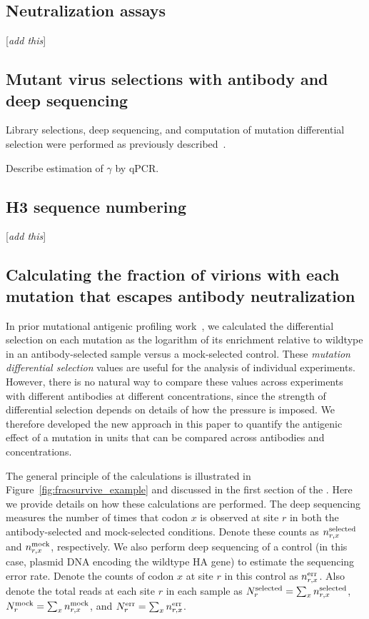 \documentclass[11pt]{article}
\newcommand{\comment}[1]{{\color{red}[\textsl{#1}]}}
\begin{document}
\subsection*{Neutralization assays}
\comment{add this}

\subsection*{Mutant virus selections with antibody and deep sequencing}
Library selections, deep sequencing, and computation of mutation differential selection were performed as previously described~\cite{doud2017complete}. 

Describe estimation of $\gamma$ by qPCR.

\subsection*{H3 sequence numbering}
\comment{add this}

\subsection*{Calculating the fraction of virions with each mutation that escapes antibody neutralization}
In prior mutational antigenic profiling work~\citep{doud2017complete,dingens2017comprehensive}, we calculated the differential selection on each mutation as the logarithm of its enrichment relative to wildtype in an antibody-selected sample versus a mock-selected control.
These \emph{mutation differential selection} values are useful for the analysis of individual experiments.
However, there is no natural way to compare these values across experiments with different antibodies at different concentrations, since the strength of differential selection depends on details of how the pressure is imposed.
We therefore developed the new approach in this paper to quantify the antigenic effect of a mutation in units that can be compared across antibodies and concentrations.

The general principle of the calculations is illustrated in Figure~\ref{fig:fracsurvive_example} and discussed in the first section of the .
Here we provide details on how these calculations are performed.
The deep sequencing measures the number of times that codon $x$ is observed at site $r$ in both the antibody-selected and mock-selected conditions. 
Denote these counts as $n_{r,x}^{\rm{selected}}$ and $n_{r,x}^{\rm{mock}}$, respectively.
We also perform deep sequencing of a control (in this case, plasmid DNA encoding the wildtype HA gene) to estimate the sequencing error rate.
Denote the counts of codon $x$ at site $r$ in this control as $n_{r,x}^{\rm{err}}$.
Also denote the total reads at each site $r$ in each sample as
$N_{r}^{\rm{selected}} = \sum_x n_{r,x}^{\rm{selected}}$,
$N_{r}^{\rm{mock}} = \sum_x n_{r,x}^{\rm{mock}}$, and
$N_{r}^{\rm{err}} = \sum_x n_{r,x}^{\rm{err}}$.
\end{document}
